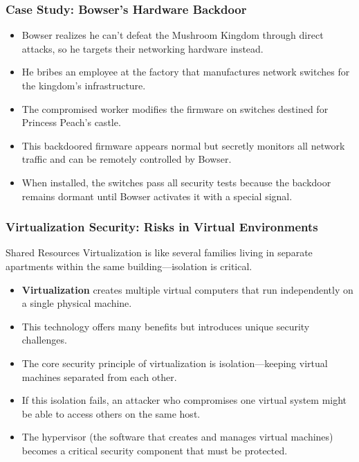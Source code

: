 \documentclass{beamer}
\begin{document}
\begin{frame}
    \frametitle{Case Study: Bowser's Hardware Backdoor}
    
    \begin{itemize}
        \item Bowser realizes he can't defeat the Mushroom Kingdom through direct attacks, so he targets their networking hardware instead.
        \item He bribes an employee at the factory that manufactures network switches for the kingdom's infrastructure.
        \item The compromised worker modifies the firmware on switches destined for Princess Peach's castle.
        \item This backdoored firmware appears normal but secretly monitors all network traffic and can be remotely controlled by Bowser.
        \item When installed, the switches pass all security tests because the backdoor remains dormant until Bowser activates it with a special signal.
    \end{itemize}
\end{frame}

\begin{frame}
    \frametitle{Virtualization Security: Risks in Virtual Environments}
    
    \begin{block}{Shared Resources}
        Virtualization is like several families living in separate apartments within the same building—isolation is critical.
    \end{block}
    
    \begin{itemize}
        \item \textbf{Virtualization} creates multiple virtual computers that run independently on a single physical machine.
        \item This technology offers many benefits but introduces unique security challenges.
        \item The core security principle of virtualization is isolation—keeping virtual machines separated from each other.
        \item If this isolation fails, an attacker who compromises one virtual system might be able to access others on the same host.
        \item The hypervisor (the software that creates and manages virtual machines) becomes a critical security component that must be protected.
    \end{itemize}
\end{frame}
\end{document}
